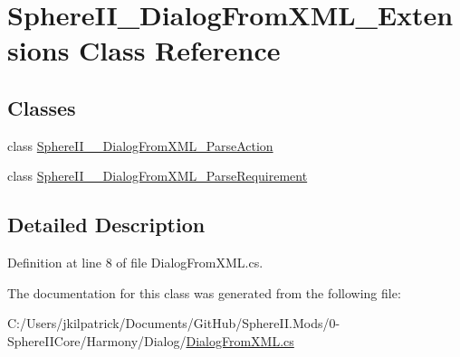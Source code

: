 \hypertarget{class_sphere_i_i___dialog_from_x_m_l___extensions}{}\section{Sphere\+I\+I\+\_\+\+Dialog\+From\+X\+M\+L\+\_\+\+Extensions Class Reference}
\label{class_sphere_i_i___dialog_from_x_m_l___extensions}
\subsection*{Classes}
\begin{DoxyCompactItemize}
\item 
class \mbox{\hyperlink{class_sphere_i_i___dialog_from_x_m_l___extensions_1_1_sphere_i_i_____dialog_from_x_m_l___parse_action}{Sphere\+I\+I\+\_\+\+\_\+\+Dialog\+From\+X\+M\+L\+\_\+\+Parse\+Action}}
\item 
class \mbox{\hyperlink{class_sphere_i_i___dialog_from_x_m_l___extensions_1_1_sphere_i_i_____dialog_from_x_m_l___parse_requirement}{Sphere\+I\+I\+\_\+\+\_\+\+Dialog\+From\+X\+M\+L\+\_\+\+Parse\+Requirement}}
\end{DoxyCompactItemize}


\subsection{Detailed Description}


Definition at line 8 of file Dialog\+From\+X\+M\+L.\+cs.



The documentation for this class was generated from the following file\+:\begin{DoxyCompactItemize}
\item 
C\+:/\+Users/jkilpatrick/\+Documents/\+Git\+Hub/\+Sphere\+I\+I.\+Mods/0-\/\+Sphere\+I\+I\+Core/\+Harmony/\+Dialog/\mbox{\hyperlink{_dialog_from_x_m_l_8cs}{Dialog\+From\+X\+M\+L.\+cs}}\end{DoxyCompactItemize}
